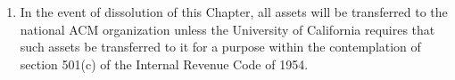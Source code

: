 
\begin{enumerate}
	\item In the event of dissolution of this Chapter, all assets will be transferred to the national ACM organization unless the University of California requires that such assets be transferred to it for a purpose within the contemplation of section 501(c) of the Internal Revenue Code of 1954.
\end{enumerate}
